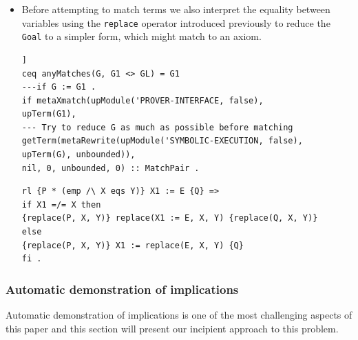 \documentclass[12pt,a4paper]{article}
\begin{document}
{\begin{itemize}
	
	However, Maude does not allow for variables to appear for the first time on the right hand side of a rewrite rule which needs to be used without meta-level computations (problem present when modeling the Separation Logics as well). We had to find a work around for this problem and the solution we came up with was to write the axiom in its meta-representation, and then use the \texttt{downTerm} operator to bring it down in the meta-hierarchy (Listing \ref{axiom})
	
	\begin{lstlisting}[label=axiom,caption=Initialization of Prover state]
rl [proveGoal] : < prove(HQ) ; RG ; G ; GS ; GL ; nil > =>
< noAction ; HQ ; noGoal ; HQ <> emptyGL ; 
downTerm('`{_`}_`{_`}['_|->_['E:AExp,'_:AExp],'`[_`]:=_['E:AExp,'F:AExp],'_|->_['E:AExp,'F:AExp]] , emptyGL)
--- ... [other axioms omitted for clarity] 
; 'begin '\n > .\end{lstlisting}
	\item Before attempting to match terms we also interpret the equality between variables using the \texttt{replace} operator introduced previously to reduce the \texttt{Goal} to a simpler form, which might match to an axiom.
	\begin{lstlisting}[caption=Equation reducing the goal before attempting to match it]]
ceq anyMatches(G, G1 <> GL) = G1
---if G := G1 .
if metaXmatch(upModule('PROVER-INTERFACE, false), 
upTerm(G1),
--- Try to reduce G as much as possible before matching
getTerm(metaRewrite(upModule('SYMBOLIC-EXECUTION, false), upTerm(G), unbounded)),
nil, 0, unbounded, 0) :: MatchPair .
	\end{lstlisting} 
	\begin{lstlisting}[caption=Rule intepreting variable equality]
rl {P * (emp /\ X eqs Y)} X1 := E {Q} =>  
if X1 =/= X then 
{replace(P, X, Y)} replace(X1 := E, X, Y) {replace(Q, X, Y)}
else 
{replace(P, X, Y)} X1 := replace(E, X, Y) {Q}
fi .\end{lstlisting}
\end{itemize}
\subsubsection{Automatic demonstration of implications}
Automatic demonstration of implications is one of the most challenging aspects of this paper and this section will present our incipient approach to this problem.

}
\end{document}
